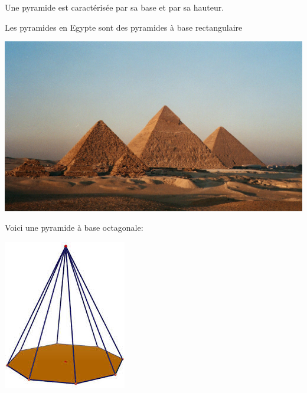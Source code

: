     
 
\begin{description}[leftmargin=*]
\begin{minipage}[t]{0.48\linewidth}
\item Une pyramide est caractérisée par sa base et par sa hauteur.
\item Les pyramides en Egypte sont des pyramides à base rectangulaire

\includegraphics[scale=0.05]{RepS-les-pyramides-d-egypte.jpg} 
\end{minipage} 
\hfill
\begin{minipage}[t]{0.48\linewidth}
\item Voici une pyramide à base octagonale:

\includegraphics[scale=0.3]{RepS-pyramide_octogonale.jpg} 
\end{minipage}
\end{description}
